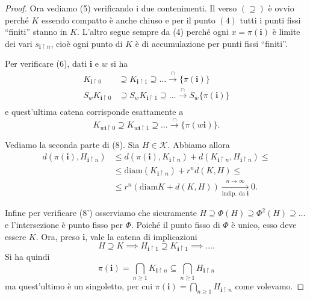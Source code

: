 \begin{proof}
	Ora vediamo (5) verificando i due contenimenti. Il verso $(\supseteq)$ è ovvio perché $K$ essendo compatto è anche chiuso e per il punto $(4)$ tutti i punti fissi ``finiti'' stanno in $K$. L'altro segue sempre da (4) perché ogni $x = \pi(\mathbf i)$ è limite dei vari $s_{\mathbf i\upharpoonright n}$, cioè ogni punto di $K$ è di accumulazione per punti fissi ``finiti''.
	
	Per verificare (6), dati $\mathbf i$ e $w$ si ha 
	\begin{align*}
		K_{\mathbf i\upharpoonright 0} &\supseteq K_{\mathbf i\upharpoonright 1}\supseteq \dots\xrightarrow{\cap}\{\pi(\mathbf i)\}\\
		S_{w}K_{\mathbf i\upharpoonright 0} &\supseteq S_{w}K_{\mathbf i\upharpoonright 1}\supseteq \dots\xrightarrow{\cap}S_{w}\{\pi(\mathbf i)\}\\
	\end{align*}
	e quest'ultima catena corrisponde esattamente a 
	$$K_{w\mathbf i\upharpoonright 0} \supseteq K_{w\mathbf i\upharpoonright 1}\supseteq \dots\xrightarrow{\cap}\{\pi(w\mathbf i)\}.$$
	
	Vediamo la seconda parte di (8). 
	Sia $H\in\mathcal K$. Abbiamo allora 
	\begin{align*}
		d(\pi(\mathbf i), H_{\mathbf i\upharpoonright n}) &\leq
		d(\pi(\mathbf i), K_{\mathbf i\upharpoonright n}) + d(K_{\mathbf i\upharpoonright n}, H_{\mathbf i\upharpoonright n})\leq \\ &\leq
		\text{diam}(K_{\mathbf i\upharpoonright n}) + r^{n}d(K,H) \leq \\ &\leq
		r^{n}(\text{diam} K + d(K,H)) \xrightarrow[\text{indip. da }\mathbf i]{n\to\infty}0.
	\end{align*}

	Infine per verificare (8') osserviamo che sicuramente $H\supseteq \Phi(H)\supseteq \Phi^{2}(H)\supseteq\dots$ e l'intersezione è punto fisso per $\Phi$. 
	Poiché il punto fisso di $\Phi$ è unico, esso deve essere $K$. 
	Ora, preso $\mathbf i$, vale la catena di implicazioni
	$$H\supseteq K\implies H_{\mathbf i\upharpoonright 1}\supseteq K_{\mathbf i\upharpoonright 1} \implies \dots.$$
	Si ha quindi 
	$$\pi(\mathbf i) = \bigcap_{n\geq1}K_{\mathbf i\upharpoonright n} \subseteq \bigcap_{n\geq1}H_{\mathbf i\upharpoonright n}$$
	ma quest'ultimo è un singoletto, per cui $\pi(\mathbf i) = \bigcap_{n\geq1}H_{\mathbf i\upharpoonright n}$ come volevamo.
	
\end{proof}




